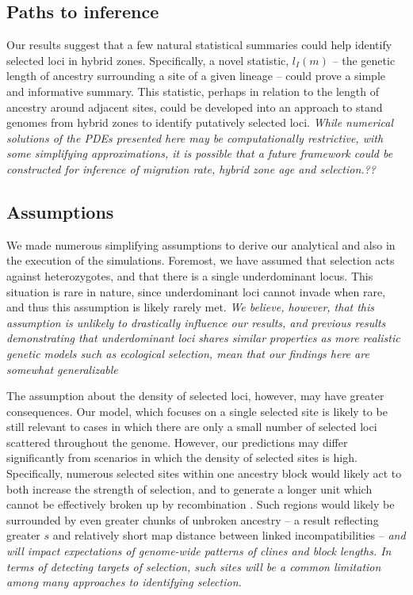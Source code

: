 \documentclass[12pt]{article}
\newcommand{\alisa}[1]{{\em \color{red} #1}}
\begin{document}
\subsection*{Paths to inference}
Our results suggest that a few natural statistical summaries could help identify selected loci in hybrid zones. 
Specifically, a novel statistic, $l_I(m)$ -- the genetic length of ancestry surrounding a site of a given lineage -- could prove a simple and informative summary. 
This statistic, perhaps in relation to the length of ancestry around adjacent sites, could be developed into an approach to stand genomes from hybrid zones to identify putatively selected loci. \alisa{While numerical solutions of the PDEs presented here may be computationally restrictive, with some simplifying approximations, it is possible that a future framework could be constructed for inference of migration rate, hybrid zone age and selection.??}

\subsection*{Assumptions}
We made numerous simplifying assumptions to derive our analytical and also in the execution of the simulations. %
Foremost, we have assumed that selection acts against heterozygotes, and that there is a single underdominant locus. This situation is rare in nature, since underdominant loci cannot invade when rare, and thus this assumption is likely rarely met. \alisa{We believe, however, that this assumption is unlikely to drastically influence our results, and previous results demonstrating that underdominant loci shares similar properties as more realistic genetic models such as ecological selection, mean that our findings here are somewhat generalizable} \citep{Barton1989, Barton1993}

The assumption about the density of selected loci, however, may have greater consequences. Our model, which focuses on a single selected site is likely to be still relevant to cases in which there are only a small number of selected loci scattered throughout the genome. However, our predictions may differ significantly from scenarios in which the density of selected sites is high. Specifically, numerous selected sites within one ancestry block would likely act to both  increase the strength of selection, and to generate a longer unit which cannot be effectively broken up by recombination   \citep{Barton1983,Kruuk1999}. Such regions would likely be surrounded by even greater chunks of unbroken ancestry -- a result reflecting  greater $s$ and relatively short map distance between linked incompatibilities -- \alisa{and will impact expectations of genome-wide patterns of clines and block lengths. In terms of detecting targets of selection, such sites will be a common limitation among many approaches to identifying selection.}
\end{document}
